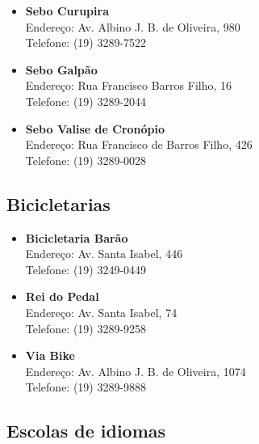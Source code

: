 \begin{itemize}
\item   \textbf{Sebo Curupira}
		\\Endereço: Av. Albino J. B. de Oliveira, 980
		\\Telefone: (19) 3289-7522

\item   \textbf{Sebo Galpão}
		\\Endereço: Rua Francisco Barros Filho, 16
		\\Telefone: (19) 3289-2044

\item   \textbf{Sebo Valise de Cronópio}
		\\Endereço: Rua Francisco de Barros Filho, 426
		\\Telefone: (19) 3289-0028
\end{itemize}

\subsection{Bicicletarias}

\begin{itemize}
\item   \textbf{Bicicletaria Barão}
		\\Endereço: Av. Santa Isabel, 446
		\\Telefone: (19) 3249-0449

\item   \textbf{Rei do Pedal}
		\\Endereço: Av. Santa Isabel, 74
		\\Telefone: (19) 3289-9258

\item   \textbf{Via Bike}
		\\Endereço: Av. Albino J. B. de Oliveira, 1074
		\\Telefone: (19) 3289-9888
\end{itemize}

\subsection{Escolas de idiomas}


